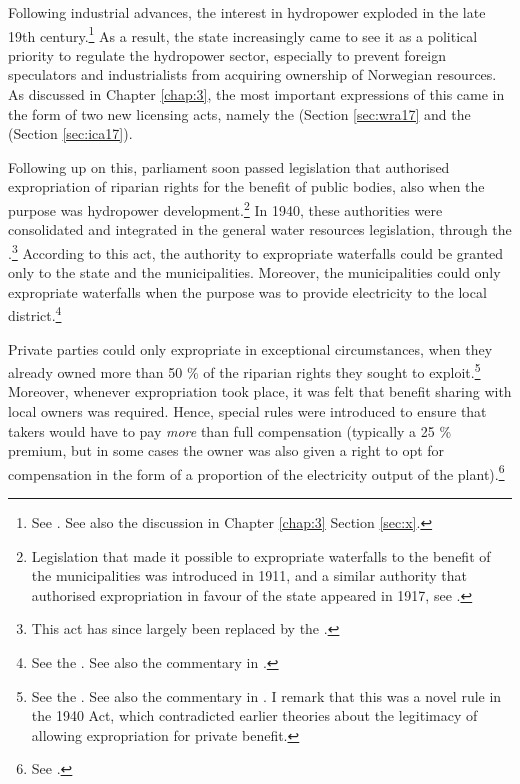 Following industrial advances, the interest in hydropower exploded in the late 19th century.\footnote{See \cite[58-59]{falkanger87}. See also the discussion in Chapter \ref{chap:3} Section \ref{sec:x}.} As a result, the state increasingly came to see it as a political priority to regulate the hydropower sector, especially to prevent foreign speculators and industrialists from acquiring ownership of Norwegian resources. As discussed in Chapter \ref{chap:3}, the most important expressions of this came in the form of two new licensing acts, namely the \cite{wra17} (Section \ref{sec:wra17} and the \cite{ica17} (Section \ref{sec:ica17}).


Following up on this, parliament soon passed legislation that authorised expropriation of riparian rights for the benefit of public bodies, also when the purpose was hydropower development.\footnote{Legislation that made it possible to expropriate waterfalls to the benefit of the municipalities was introduced in 1911, and a similar authority that authorised expropriation in favour of the state appeared in 1917, see \cite[29]{amundsen28}.} In 1940, these authorities were consolidated and integrated in the general water resources legislation, through the \cite{wra40}.\footnote{This act has since largely been replaced by the \cite{wra00}.} According to this act, the authority to expropriate waterfalls could be granted only to the state and the municipalities. Moreover, the municipalities could only expropriate waterfalls when the purpose was to provide electricity to the local district.\footnote{See the \cite[148]{wra40}. See also the commentary in \cite[201-210]{sorensen41}.}

Private parties could only expropriate in exceptional circumstances, when they already owned more than 50 \% of the riparian rights they sought to exploit.\footnote{See the \cite[55]{wra40}. See also the commentary in \cite[70-74]{sorensen41}. I remark that this was a novel rule in the 1940 Act, which contradicted earlier theories about the legitimacy of allowing expropriation for private benefit.} Moreover, whenever expropriation took place, it was felt that benefit sharing with local owners was required. Hence, special rules were introduced to ensure that takers would have to pay {\it more} than full compensation (typically a 25 \% premium, but in some cases the owner was also given a right to opt for compensation in the form of a proportion of the electricity output of the plant).\footnote{See \cite[70-91,184,210]{sorensen41}.}

